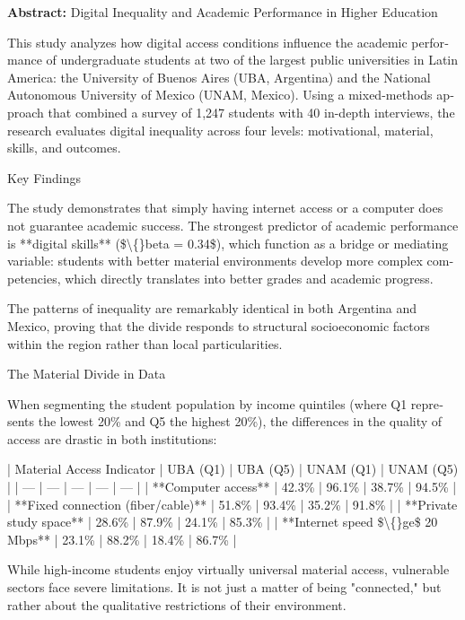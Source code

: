 \begin{tcolorbox}[colback=brown!8!white,colframe=brown!8!white,boxrule=0pt,arc=2pt,left=4pt,right=4pt,top=3pt,bottom=3pt,before skip=4pt,after skip=4pt]
\begin{otherlanguage}{english}
\sffamily\small \textbf{Abstract:} Digital Inequality and Academic Performance in Higher Education

This study analyzes how digital access conditions influence the academic performance of undergraduate students at two of the largest public universities in Latin America: the University of Buenos Aires (UBA, Argentina) and the National Autonomous University of Mexico (UNAM, Mexico). Using a mixed-methods approach that combined a survey of 1,247 students with 40 in-depth interviews, the research evaluates digital inequality across four levels: motivational, material, skills, and outcomes.

Key Findings

The study demonstrates that simply having internet access or a computer does not guarantee academic success. The strongest predictor of academic performance is **digital skills** (\$\textbackslash\{\}beta = 0.34\$), which function as a bridge or mediating variable: students with better material environments develop more complex competencies, which directly translates into better grades and academic progress.

The patterns of inequality are remarkably identical in both Argentina and Mexico, proving that the divide responds to structural socioeconomic factors within the region rather than local particularities.

The Material Divide in Data

When segmenting the student population by income quintiles (where Q1 represents the lowest 20\% and Q5 the highest 20\%), the differences in the quality of access are drastic in both institutions:

| Material Access Indicator | UBA (Q1) | UBA (Q5) | UNAM (Q1) | UNAM (Q5) |
| --- | --- | --- | --- | --- |
| **Computer access** | 42.3\% | 96.1\% | 38.7\% | 94.5\% |
| **Fixed connection (fiber/cable)** | 51.8\% | 93.4\% | 35.2\% | 91.8\% |
| **Private study space** | 28.6\% | 87.9\% | 24.1\% | 85.3\% |
| **Internet speed \$\textbackslash\{\}ge\$ 20 Mbps** | 23.1\% | 88.2\% | 18.4\% | 86.7\% |

While high-income students enjoy virtually universal material access, vulnerable sectors face severe limitations. It is not just a matter of being "connected," but rather about the qualitative restrictions of their environment.


\end{otherlanguage}
\end{tcolorbox}
